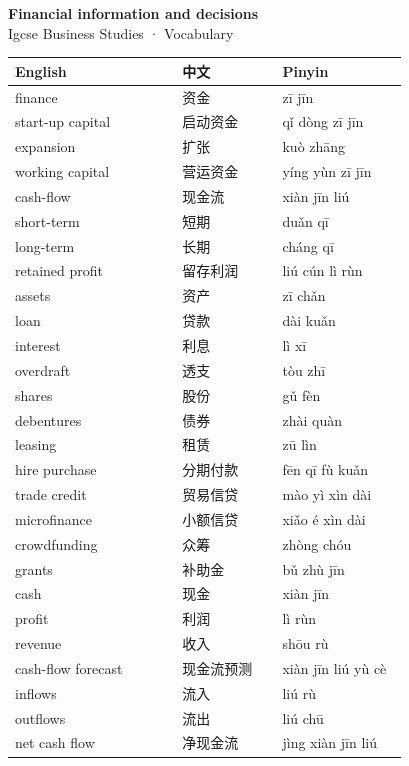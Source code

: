\documentclass[11pt]{article}
\begin{document}
\begin{center}
  {\LARGE\bfseries Financial information and decisions}\\[0.35em]
  {\large Igcse Business Studies · Vocabulary}
\end{center}
\vspace{0.6em}

\begin{longtable}{@{}p{0.40\linewidth}p{0.24\linewidth}p{0.30\linewidth}@{}}
\toprule
\textbf{English} & \textbf{中文} & \textbf{Pinyin} \\
\midrule
\endhead
\bottomrule
\endlastfoot
finance & 资金 & zī jīn \\
start-up capital & 启动资金 & qǐ dòng zī jīn \\
expansion & 扩张 & kuò zhāng \\
working capital & 营运资金 & yíng yùn zī jīn \\
cash-flow & 现金流 & xiàn jīn liú \\
short-term & 短期 & duǎn qī \\
long-term & 长期 & cháng qī \\
retained profit & 留存利润 & liú cún lì rùn \\
assets & 资产 & zī chǎn \\
loan & 贷款 & dài kuǎn \\
interest & 利息 & lì xī \\
overdraft & 透支 & tòu zhī \\
shares & 股份 & gǔ fèn \\
debentures & 债券 & zhài quàn \\
leasing & 租赁 & zū lìn \\
hire purchase & 分期付款 & fēn qī fù kuǎn \\
trade credit & 贸易信贷 & mào yì xìn dài \\
microfinance & 小额信贷 & xiǎo é xìn dài \\
crowdfunding & 众筹 & zhòng chóu \\
grants & 补助金 & bǔ zhù jīn \\
cash & 现金 & xiàn jīn \\
profit & 利润 & lì rùn \\
revenue & 收入 & shōu rù \\
cash-flow forecast & 现金流预测 & xiàn jīn liú yù cè \\
inflows & 流入 & liú rù \\
outflows & 流出 & liú chū \\
net cash flow & 净现金流 & jìng xiàn jīn liú \\

\end{longtable}
\end{document}

